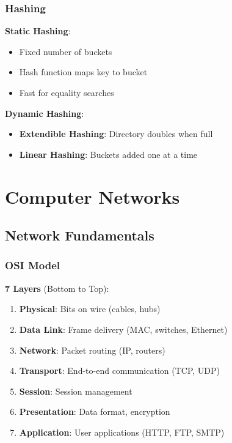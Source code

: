 \documentclass[12pt,a4paper]{report}
\begin{document}
\subsection{Hashing}
\begin{concept}
\textbf{Static Hashing}:
\begin{itemize}
    \item Fixed number of buckets
    \item Hash function maps key to bucket
    \item Fast for equality searches
\end{itemize}

\textbf{Dynamic Hashing}:
\begin{itemize}
    \item \textbf{Extendible Hashing}: Directory doubles when full
    \item \textbf{Linear Hashing}: Buckets added one at a time
\end{itemize}
\end{concept}

\chapter{Computer Networks}

\section{Network Fundamentals}

\subsection{OSI Model}
\begin{concept}
\textbf{7 Layers} (Bottom to Top):
\begin{enumerate}
    \item \textbf{Physical}: Bits on wire (cables, hubs)
    \item \textbf{Data Link}: Frame delivery (MAC, switches, Ethernet)
    \item \textbf{Network}: Packet routing (IP, routers)
    \item \textbf{Transport}: End-to-end communication (TCP, UDP)
    \item \textbf{Session}: Session management
    \item \textbf{Presentation}: Data format, encryption
    \item \textbf{Application}: User applications (HTTP, FTP, SMTP)
\end{enumerate}
\end{concept}
\end{document}
